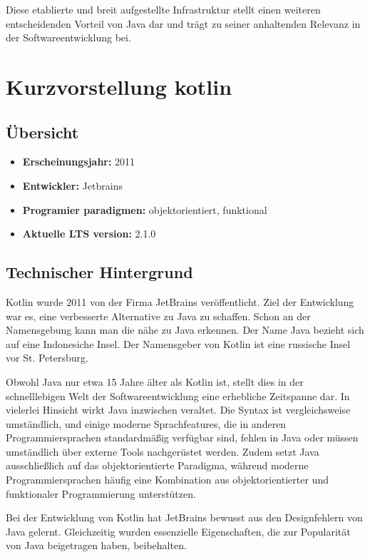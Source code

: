 \documentclass[11pt]{article}
\begin{document}
    Diese etablierte und breit aufgestellte Infrastruktur stellt einen weiteren entscheidenden Vorteil von Java dar und
    trägt zu seiner anhaltenden Relevanz in der Softwareentwicklung bei.\\


    \section{Kurzvorstellung kotlin}

    \subsection{Übersicht}
    \begin{itemize}
        \item \textbf{Erscheinungsjahr:} 2011
        \item \textbf{Entwickler:} Jetbrains
        \item \textbf{Programier paradigmen:} objektorientiert, funktional
        \item \textbf{Aktuelle LTS version:} 2.1.0
    \end{itemize}

    \subsection{Technischer Hintergrund}
    Kotlin wurde 2011 von der Firma JetBrains veröffentlicht.
    Ziel der Entwicklung war es, eine verbesserte Alternative zu Java zu schaffen.
    Schon an der Namensgebung kann man die nähe zu Java erkennen.
    Der Name Java bezieht sich auf eine Indonesiche Insel.
    Der Namensgeber von Kotlin ist eine russische Insel vor St. Petersburg.

    Obwohl Java nur etwa 15 Jahre älter als Kotlin ist, stellt dies in der schnelllebigen Welt der Softwareentwicklung eine erhebliche Zeitspanne dar.
    In vielerlei Hinsicht wirkt Java inzwischen veraltet.
    Die Syntax ist vergleichsweise umständlich, und einige moderne Sprachfeatures, die in anderen Programmiersprachen standardmäßig verfügbar sind, fehlen in Java oder
    müssen umständlich über externe Tools nachgerüstet werden.
    Zudem setzt Java ausschließlich auf das objektorientierte Paradigma,
    während moderne Programmiersprachen häufig eine Kombination aus objektorientierter und funktionaler Programmierung unterstützen.

    Bei der Entwicklung von Kotlin hat JetBrains bewusst aus den Designfehlern von Java gelernt.
    Gleichzeitig wurden essenzielle Eigenschaften, die zur Popularität von Java beigetragen haben, beibehalten.
\end{document}
